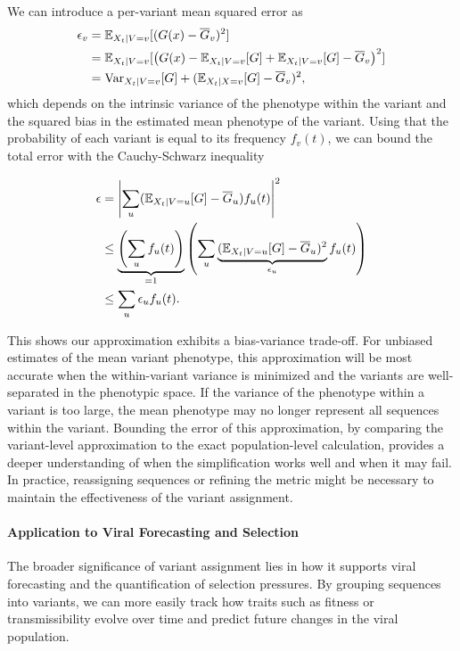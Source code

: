 We can introduce a per-variant mean squared error as 
\begin{align}
  \epsilon_v &= \mathbb{E}_{X_{t} \mid V=v}[(G(x) - \overline{G}_v)^2]\\
           &= \mathbb{E}_{X_{t} \mid V=v}[\left(G(x) - \mathbb{E}_{X_{t} \mid V=v}[G] + \mathbb{E}_{X_{t} \mid V=v}[G] - \overline{G}_v\right)^2 ]\\
           &= \text{Var}_{X_{t} \mid V=v}[G] + (\mathbb{E}_{X_t \mid X=v}[G] - \overline{G}_v)^2,
\end{align}
which depends on the intrinsic variance of the phenotype within the variant and the squared bias in the estimated mean phenotype of the variant.
Using that the probability of each variant is equal to its frequency $f_v(t)$, we can bound the total error with the Cauchy-Schwarz inequality

\begin{align}
  \epsilon  &= \left| \sum_{u} (\mathbb{E}_{X_{t} \mid V=u}[G] - \overline{G}_u) f_u(t)  \right|^2\\
            &\leq \underbrace{\left(\sum_{u} f_u(t) \right)}_{=1} \left(\sum_{u}  \underbrace{(\mathbb{E}_{X_{t} \mid V=u}[G] - \overline{G}_u)^2}_{\epsilon_u} f_u(t)\right)\\
            &\leq \sum_{u} \epsilon_u f_u(t).
\end{align}

This shows our approximation exhibits a bias-variance trade-off.
For unbiased estimates of the mean variant phenotype, this approximation will be most accurate when the within-variant variance is minimized and the variants are well-separated in the phenotypic space.
If the variance of the phenotype within a variant is too large, the mean phenotype may no longer represent all sequences within the variant.
Bounding the error of this approximation, by comparing the variant-level approximation to the exact population-level calculation, provides a deeper understanding of when the simplification works well and when it may fail.
In practice, reassigning sequences or refining the metric might be necessary to maintain the effectiveness of the variant assignment.

\paragraph{Application to Viral Forecasting and Selection}

The broader significance of variant assignment lies in how it supports viral forecasting and the quantification of selection pressures.
By grouping sequences into variants, we can more easily track how traits such as fitness or transmissibility evolve over time and predict future changes in the viral population.

